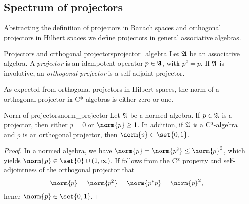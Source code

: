 \subsection{Spectrum of projectors}
Abstracting the definition of projectors in Banach spaces and orthogonal projectors in Hilbert spaces we define projectors in general associative algebras.
\begin{definition}{Projectors and orthogonal projectors}{projector_algebra}
    Let \(\mathfrak{A}\) be an associative algebra. A \emph{projector} is an idempotent operator \(p \in \mathfrak{A}\), with \(p^2 = p\). If \(\mathfrak{A}\) is involutive, an \emph{orthogonal projector} is a self-adjoint projector.
\end{definition}

As expected from orthogonal projectors in Hilbert spaces, the norm of a orthogonal projector in C*-algebras is either zero or one.
\begin{proposition}{Norm of projectors}{norm_projector}
    Let \(\mathfrak{A}\) be a normed algebra. If \(p\in \mathfrak{A}\) is a projector, then either \(p = 0\) or \(\norm{p} \geq 1\). In addition, if \(\mathfrak{A}\) is a C*-algebra and \(p\) is an orthogonal projector, then \(\norm{p} \in \set{0,1}.\)
\end{proposition}
\begin{proof}
    In a normed algebra, we have \( \norm{p} = \norm{p^2} \leq \norm{p}^2\), which yields \(\norm{p} \in \set{0}\cup(1,\infty)\). If follows from the C* property and self-adjointness of the orthogonal projector that
    \begin{equation*}
        \norm{p} = \norm{p^2} = \norm{p^*p} = \norm{p}^2,
    \end{equation*}
    hence \(\norm{p} \in \set{0,1}\).
\end{proof}


